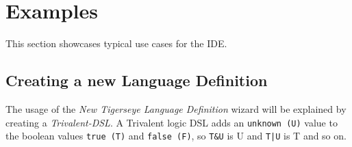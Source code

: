  
  \section{Examples}\label{sec:examples}
	This section showcases typical use cases for the \tiger IDE. 
	
	\subsection{Creating a new \tiger Language Definition}
	
	The usage of the \emph{New Tigerseye Language Definition} wizard will be explained by creating a \emph{Trivalent-DSL}. A
	Trivalent logic DSL adds an \texttt{unknown (U)} value to the boolean values \texttt{true (T)} and \texttt{false (F)}, so \texttt{T\&U} is U and \texttt{T|U} is T and so on.
	
